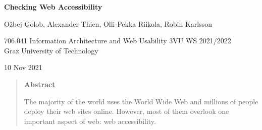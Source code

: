 \documentclass[11pt,onecolumn,twoside]{report}
\newcommand{\thistitle}{Checking Web Accessibility}  %
\newcommand{\thissubject}{}  %
\newcommand{\thisauthor}{Ožbej Golob, Alexander Thien, Olli-Pekka Riikola, Robin Karlsson}          %
\newcommand{\thisdate}{10 Nov 2021}  %
\begin{document}
\unixdate

\normalsize
\pagestyle{empty}         %




\begin{titlepage}

\begin{center}

\begin{spacing}{1.1}
\Large\sffamily\bfseries
\thistitle
\end{spacing}

\ifstrempty{\thissubject}{}%
{%
\begin{spacing}{1.1}
\large\sffamily\bfseries
\thissubject
\end{spacing}
}


\vspace{1cm}

{\large\sffamily \thisauthor}


\vspace{1cm}



{\large
706.041 Information Architecture and Web Usability 3VU WS 2021/2022 \\
Graz University of Technology \\[1cm]
}


\vspace{1cm}

\thisdate

\end{center}



\vspace{2cm}

\begin{quote}
\begin{center}
{\large\sffamily\bfseries Abstract}
\end{center}
The majority of the world uses the World Wide Web and millions of people deploy their web sites online. However, most of them overlook one important aspect of web: web accessibility. 


\end{quote}
\end{titlepage}
\end{document}
